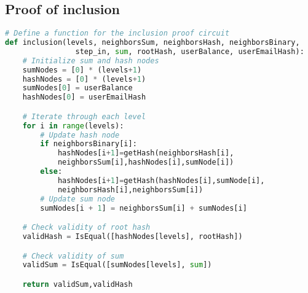 \subsection{Proof of inclusion}
\label{subsec:pic}
\begin{lstlisting}[language=Python, caption=Inclusion circuit pseudocode]
# Define a function for the inclusion proof circuit
def inclusion(levels, neighborsSum, neighborsHash, neighborsBinary, 
                step_in, sum, rootHash, userBalance, userEmailHash):
    # Initialize sum and hash nodes
    sumNodes = [0] * (levels+1)
    hashNodes = [0] * (levels+1)
    sumNodes[0] = userBalance
    hashNodes[0] = userEmailHash

    # Iterate through each level
    for i in range(levels):
        # Update hash node
        if neighborsBinary[i]:
            hashNodes[i+1]=getHash(neighborsHash[i],
            neighborsSum[i],hashNodes[i],sumNode[i])
        else:
            hashNodes[i+1]=getHash(hashNodes[i],sumNode[i],
            neighborsHash[i],neighborsSum[i])
        # Update sum node
        sumNodes[i + 1] = neighborsSum[i] + sumNodes[i]

    # Check validity of root hash
    validHash = IsEqual([hashNodes[levels], rootHash])

    # Check validity of sum
    validSum = IsEqual([sumNodes[levels], sum])

    return validSum,validHash
\end{lstlisting}

